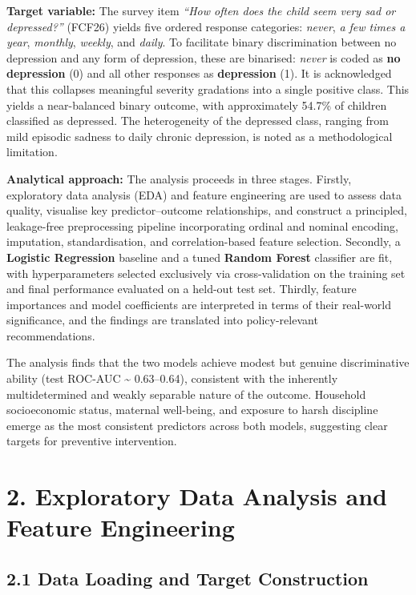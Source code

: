 \documentclass[11pt]{article}
\begin{document}
\textbf{Target variable:} The survey item \emph{``How often does the
child seem very sad or depressed?''} (FCF26) yields five ordered
response categories: \emph{never}, \emph{a few times a year},
\emph{monthly}, \emph{weekly}, and \emph{daily}. To facilitate binary
discrimination between no depression and any form of depression, these
are binarised: \emph{never} is coded as \textbf{no depression} (0) and
all other responses as \textbf{depression} (1). It is acknowledged that
this collapses meaningful severity gradations into a single positive
class. This yields a near-balanced binary outcome, with approximately
54.7\% of children classified as depressed. The heterogeneity of the
depressed class, ranging from mild episodic sadness to daily chronic
depression, is noted as a methodological limitation.

\textbf{Analytical approach:} The analysis proceeds in three stages.
Firstly, exploratory data analysis (EDA) and feature engineering are
used to assess data quality, visualise key predictor--outcome
relationships, and construct a principled, leakage-free preprocessing
pipeline incorporating ordinal and nominal encoding, imputation,
standardisation, and correlation-based feature selection. Secondly, a
\textbf{Logistic Regression} baseline and a tuned \textbf{Random Forest}
classifier are fit, with hyperparameters selected exclusively via
cross-validation on the training set and final performance evaluated on
a held-out test set. Thirdly, feature importances and model coefficients
are interpreted in terms of their real-world significance, and the
findings are translated into policy-relevant recommendations.

The analysis finds that the two models achieve modest but genuine
discriminative ability (test ROC-AUC \textasciitilde{} 0.63--0.64),
consistent with the inherently multidetermined and weakly separable
nature of the outcome. Household socioeconomic status, maternal
well-being, and exposure to harsh discipline emerge as the most
consistent predictors across both models, suggesting clear targets for
preventive intervention.

    \hypertarget{exploratory-data-analysis-and-feature-engineering}{%
\section{2. Exploratory Data Analysis and Feature
Engineering}\label{exploratory-data-analysis-and-feature-engineering}}

    \hypertarget{data-loading-and-target-construction}{%
\subsection{2.1 Data Loading and Target
Construction}\label{data-loading-and-target-construction}}
\end{document}
